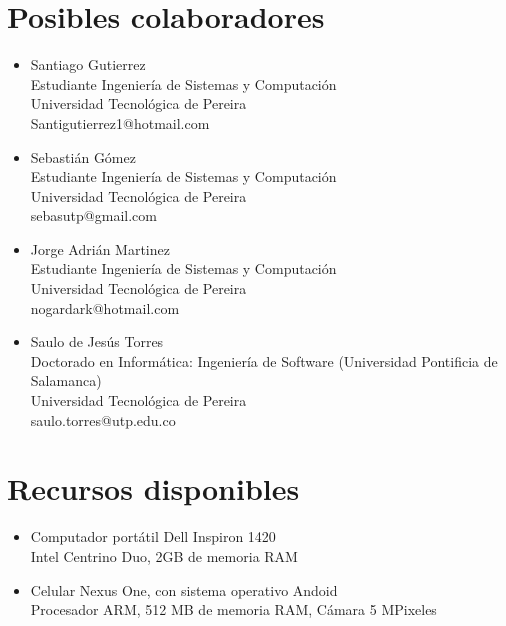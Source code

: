 \documentclass[a4paper, 11pt, oneside]{article}
\begin{document}
	\section{Posibles colaboradores}
	\begin{itemize}
   \item Santiago Gutierrez\\
Estudiante Ingeniería de Sistemas y Computación\\
Universidad Tecnológica de Pereira\\
Santigutierrez1@hotmail.com
   \item Sebastián Gómez\\
Estudiante Ingeniería de Sistemas y Computación\\
Universidad Tecnológica de Pereira\\
sebasutp@gmail.com
   \item Jorge Adrián Martinez\\
Estudiante Ingeniería de Sistemas y Computación\\
Universidad Tecnológica de Pereira\\
nogardark@hotmail.com
   \item Saulo de Jesús Torres\\
Doctorado en Informática: Ingeniería de Software (Universidad Pontificia de Salamanca)\\
Universidad Tecnológica de Pereira\\
saulo.torres@utp.edu.co
	\end{itemize}
	\clearpage
	
	\section{Recursos disponibles}
	\begin{itemize}
		\item Computador portátil Dell Inspiron 1420\\
			Intel Centrino Duo, 2GB de memoria RAM
		\item Celular Nexus One, con sistema operativo Andoid\\
			Procesador ARM, 512 MB de memoria RAM, Cámara 5 MPixeles
	\end{itemize}
	\clearpage
	


\nocite{*}
\end{document}
